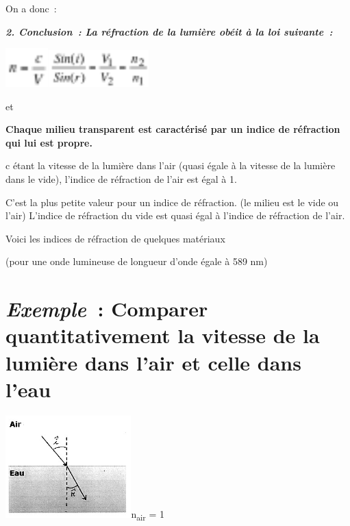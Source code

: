 On a donc~:

\emph{\textbf{2. Conclusion~: La réfraction de la lumière obéit à la loi
suivante~: }}

\includegraphics[width=1.646cm,height=1.505cm]{Pictures/100000010000001700000015258C94298A52913B.png}\includegraphics[width=3.903cm,height=1.434cm]{Pictures/100000010000003E0000001763CB6753C8718293.png}

\textbf{ }et

\textbf{ }

\textbf{Chaque milieu transparent est caractérisé par un indice de
réfraction qui lui est propre. }

c étant la vitesse de la lumière dans l'air (quasi égale à la vitesse de
la lumière dans le vide), l'indice de réfraction de l'air est égal à 1.

C'est la plus petite valeur pour un indice de réfraction. (le milieu est
le vide ou l'air) L'indice de réfraction du vide est quasi égal à
l'indice de réfraction de l'air.

Voici les indices de réfraction de quelques matériaux

(pour une onde lumineuse de longueur d'onde égale à 589 nm)

\hypertarget{section}{%
\section{}\label{section}}

\hypertarget{exemple-comparer-quantitativement-la-vitesse-de-la-lumiuxe8re-dans-lair-et-celle-dans-leau}{%
\section{\texorpdfstring{\emph{Exemple~}: Comparer quantitativement la
vitesse de la lumière dans l'air et celle dans
l'eau}{Exemple~: Comparer quantitativement la vitesse de la lumière dans l'air et celle dans l'eau}}\label{exemple-comparer-quantitativement-la-vitesse-de-la-lumiuxe8re-dans-lair-et-celle-dans-leau}}

\includegraphics[width=4.852cm,height=3.941cm]{Pictures/100000010000014300000106184F9C7B3CC9C08A.png}n\textsubscript{air}
= 1

